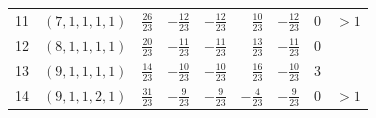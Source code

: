 \begin{table}[t]
\begin{tabular}{@{}rlrrrrrcl@{}}
11 & $(7,1,1,1,1)$ & $\frac{26}{23}$ & $-\frac{12}{23}$ & $-\frac{12}{23}$ & $\frac{10}{23}$ & $-\frac{12}{23}$ & 0 & $>1$ \\
12 & $(8,1,1,1,1)$ & $\frac{20}{23}$ & $-\frac{11}{23}$ & $-\frac{11}{23}$ & $\frac{13}{23}$ & $-\frac{11}{23}$ & 0 &  \\
13 & $(9,1,1,1,1)$ & $\frac{14}{23}$ & $-\frac{10}{23}$ & $-\frac{10}{23}$ & $\frac{16}{23}$ & $-\frac{10}{23}$ & 3 &  \\
14 & $(9,1,1,2,1)$ & $\frac{31}{23}$ & $-\frac{9}{23}$ & $-\frac{9}{23}$ & $-\frac{4}{23}$ & $-\frac{9}{23}$ & 0 & $>1$ \\
\bottomrule
\end{tabular}
\end{table}
